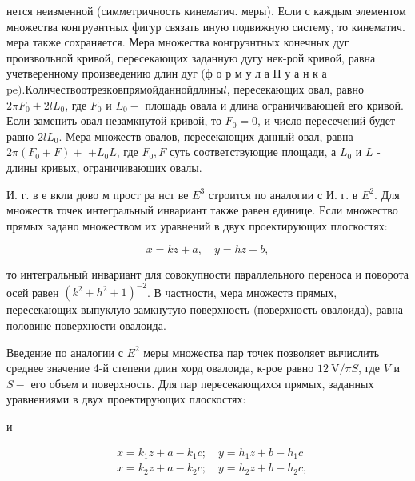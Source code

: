 \documentclass[10pt]{article}
\begin{document}
нется неизменной (симметричность кинематич. меры). Если с каждым элементом множества конгруәнтных фигур связать иную подвижную систему, то кинематич. мера также сохраняется. Мера множества конгруэнтных конечных дуг произвольной кривой, пересекающих заданную дугу нек-рой кривой, равна учетверенному произведению длин дуг (ф о р м у л а П у а н к а$\mathrm{pe).} \mathrm{Количество} \mathrm{отрезков} \mathrm{прямой} \mathrm{данной} \mathrm{длины} l$, пересекающих овал, равно $2 \pi F_{0}+2 l L_{0}$, где $F_{0}$ и $L_{0}-$ площадь овала и длина ограничивающей его кривой. Если заменить овал незамкнутой кривой, то $F_{0}=0$, и число пересечений будет равно $2 l L_{0}$. Мера множеств овалов, пересекающих данный овал, равна $2 \pi\left(F_{0}+F\right)+$ $+L_{0} L$, где $F_{0}, F$ суть соответствующие площади, а $L_{0}$ и $L$ - длины кривых, ограничивающих овалы.



И. г. в е вкли дово м прост ра нст ве $E^{3}$ строится по аналогии с И. г. в $E^{2}$. Для множеств точек интегральный инвариант также равен единице. Если множество прямых задано множеством их уравнений в двух проектирующих плоскостях:



\[

x=k z+a, \quad y=h z+b,

\]



то интегральный инвариант для совокупности параллельного переноса и поворота осей равен $\left(k^{2}+h^{2}+1\right)^{-2}$. В частности, мера множеств прямых, пересекающих выпуклую замкнутую поверхность (поверхность овалоида), равна половине поверхности овалоида.



Введение по аналогии с $E^{2}$ меры множества пар точек позволяет вычислить среднее значение 4-й степени длин хорд овалоида, к-рое равно $12 \mathrm{~V} / \pi S$, где $V$ и $S-$ его объем и поверхность. Для пар пересекающихся прямых, заданных уравнениями в двух проектирующих плоскостях:



и



\[

\begin{aligned}

& x=k_{1} z+a-k_{1} c ; \quad y=h_{1} z+b-h_{1} c \\

& x=k_{2} z+a-k_{2} c ; \quad y=h_{2} z+b-h_{2} c,

\end{aligned}

\]
\end{document}
